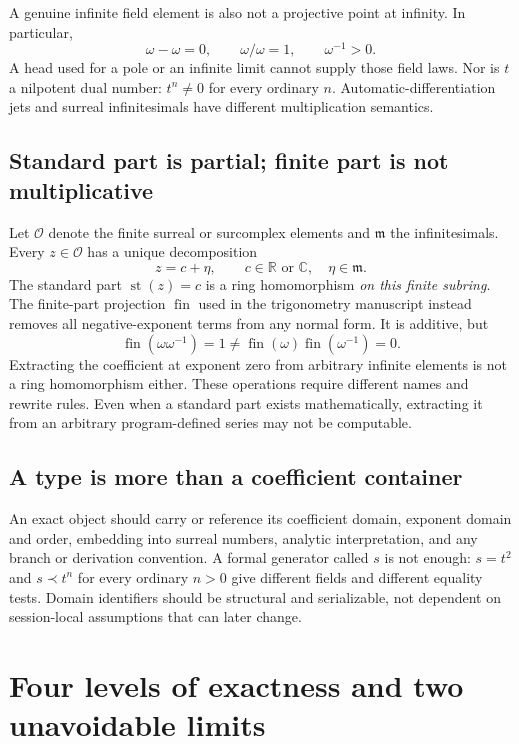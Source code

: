 \documentclass[11pt,letterpaper]{article}
\theoremstyle{definition}
\newcommand{\R}{\mathbb R}
\newcommand{\C}{\mathbb C}
\newcommand{\OO}{\mathcal O}
\newcommand{\mm}{\mathfrak m}
\newcommand{\st}{\operatorname{st}}
\newcommand{\fin}{\operatorname{fin}}
\numberwithin{equation}{section}
\begin{document}
A genuine infinite field element is also not a projective point at infinity. In particular,
\[
 \omega-\omega=0,\qquad \omega/\omega=1,\qquad \omega^{-1}>0.
\]
A head used for a pole or an infinite limit cannot supply those field laws. Nor is $t$ a nilpotent dual number: $t^n\ne0$ for every ordinary $n$. Automatic-differentiation jets and surreal infinitesimals have different multiplication semantics.

\subsection{Standard part is partial; finite part is not multiplicative}
Let $\OO$ denote the finite surreal or surcomplex elements and $\mm$ the infinitesimals. Every $z\in\OO$ has a unique decomposition
\[
 z=c+\eta,\qquad c\in\R\text{ or }\C,\quad\eta\in\mm.
\]
The standard part $\st(z)=c$ is a ring homomorphism \emph{on this finite subring}. The finite-part projection $\fin$ used in the trigonometry manuscript instead removes all negative-exponent terms from any normal form. It is additive, but
\[
 \fin(\omega\omega^{-1})=1\ne
 \fin(\omega)\fin(\omega^{-1})=0.
\]
Extracting the coefficient at exponent zero from arbitrary infinite elements is not a ring homomorphism either. These operations require different names and rewrite rules. Even when a standard part exists mathematically, extracting it from an arbitrary program-defined series may not be computable.

\subsection{A type is more than a coefficient container}
An exact object should carry or reference its coefficient domain, exponent domain and order, embedding into surreal numbers, analytic interpretation, and any branch or derivation convention. A formal generator called $s$ is not enough: $s=t^2$ and $s\prec t^n$ for every ordinary $n>0$ give different fields and different equality tests. Domain identifiers should be structural and serializable, not dependent on session-local assumptions that can later change.

\section{Four levels of exactness and two unavoidable limits}\label{sec:exactness}
\end{document}
